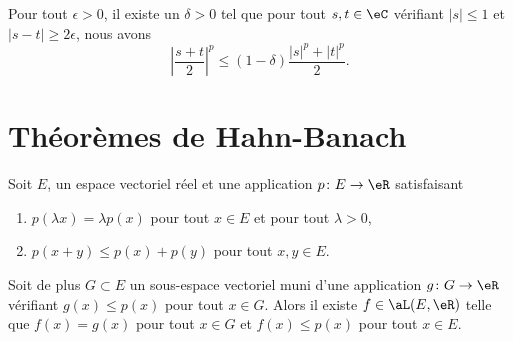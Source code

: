 \begin{lemma}        \label{LEMooLDQRooEGWDlm}
    Pour tout \( \epsilon>0\), il existe un \( \delta>0\) tel que pour tout \( s,t\in \eC\) vérifiant \( | s |\leq 1\) et \( | s-t |\geq 2\epsilon\), nous avons
    \begin{equation}
        \left| \frac{ s+t }{ 2 } \right|^p\leq (1-\delta)\frac{ | s |^p+| t |^p }{2}.
    \end{equation}
\end{lemma}

\section{Théorèmes de Hahn-Banach}

\begin{theorem}
    Soit \( E\), un espace vectoriel réel et une application \( p\colon E\to \eR\) satisfaisant
    \begin{enumerate}
        \item
            \( p(\lambda x)=\lambda p(x)\) pour tout \( x\in E\) et pour tout \( \lambda>0\),
        \item
            \( p(x+y)\leq p(x)+p(y)\) pour tout \( x,y\in E\).
    \end{enumerate}
    Soit de plus \( G\subset E\) un sous-espace vectoriel muni d'une application \( g\colon G\to \eR\) vérifiant \( g(x)\leq p(x)\) pour tout \( x\in G\). Alors il existe \( f\in\aL(E,\eR)\) telle que \( f(x)=g(x)\) pour tout \( x\in G\) et \( f(x)\leq p(x)\) pour tout \( x\in E\).
\end{theorem}

